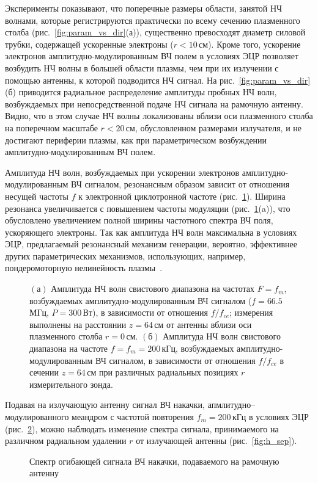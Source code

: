 \documentclass[autoref,10pt]{disser}
\begin{document}
Эксперименты показывают, что поперечные размеры области, занятой НЧ волнами, которые регистрируются практически по всему сечению плазменного столба (\mbox{рис.~\ref{fig:param_vs_dir}(а)}), существенно превосходят диаметр силовой трубки, содержащей ускоренные электроны ($r < 10$\,см). Кроме того, ускорение электронов амплитудно-мо\-ду\-ли\-ро\-ван\-ным ВЧ полем в условиях ЭЦР позволяет возбудить НЧ волны в большей области плазмы, чем при их излучении с помощью антенны, к которой подводится НЧ сигнал. На \mbox{рис.~\ref{fig:param_vs_dir}(б)} приводится радиальное распределение амплитуды пробных НЧ волн, возбуждаемых при непосредственной подаче НЧ сигнала на рамочную антенну. Видно, что в этом случае НЧ волны локализованы вблизи оси плазменного столба на поперечном масштабе $r < 20$\,см, обусловленном размерами излучателя, и не достигают периферии плазмы, как при параметрическом возбуждении амплитудно-модулированным ВЧ полем.   

Амплитуда НЧ волн, возбуждаемых при ускорении электронов ам\-пли\-ту\-дно-мо\-ду\-ли\-ро\-ван\-ным ВЧ сигналом, резонансным образом зависит от отношения несущей частоты $f$ к электронной циклотронной частоте (\mbox{рис.~\ref{fig:param_vs_dir_res}}). Ширина резонанса увеличивается с повышением частоты модуляции (\mbox{рис.~\ref{fig:param_vs_dir_res}(a)}), что обусловлено увеличением полной ширины частотного спектра ВЧ поля, ускоряющего электроны. Так как амплитуда НЧ волн максимальна в условиях ЭЦР, предлагаемый резонансный механизм генерации, вероятно, эффективнее других параметрических механизмов, использующих, например, пондеромоторную нелинейность плазмы~\cite{Gushchin}.
\begin{figure}[H]
  \centering
  \def\svgwidth{0.6\columnwidth} %
  
  \vspace{0.3cm}
  \caption{$(а)$ Амплитуда НЧ волн свистового диапазона на частотах $F=f_m$, возбуждаемых амплитудно-модулированным ВЧ сигналом ($f=66.5$\,МГц, $P=300$\,Вт), в зависимости от отношения $f/f_{ce}$; измерения выполнены на расстоянии $z=64$\,см от антенны вблизи оси плазменного столба $r=0$\,см. $(б)$ Амплитуда НЧ волн свистового диапазона на частоте $f=f_m=200$\,кГц, возбуждаемых амплитудно-модулированным ВЧ сигналом, в зависимости от отношения $f/f_{ce}$ в сечении $z=64$\,см при различных радиальных позициях $r$ измерительного зонда.}
  \label{fig:param_vs_dir_res}
\end{figure}

Подавая на излучающую антенну сигнал ВЧ накачки, апмлитудно--мо\-ду\-ли\-ро\-ван\-ного меандром с частотой повторения $f_m=200$\,кГц в условиях ЭЦР (\mbox{рис.~\ref{fig:h_sep_base}}), можно наблюдать изменение спектра сигнала, принимаемого на различном радиальном удалении $r$ от излучающей антенны (\mbox{рис.~\ref{fig:h_sep}}).
\begin{figure}[H]
    \centering
    \def\svgwidth{0.9\columnwidth} %
    
    \caption{Спектр огибающей сигнала ВЧ накачки, подаваемого на рамочную антенну}
    \label{fig:h_sep_base}
 \end{figure}
\end{document}
